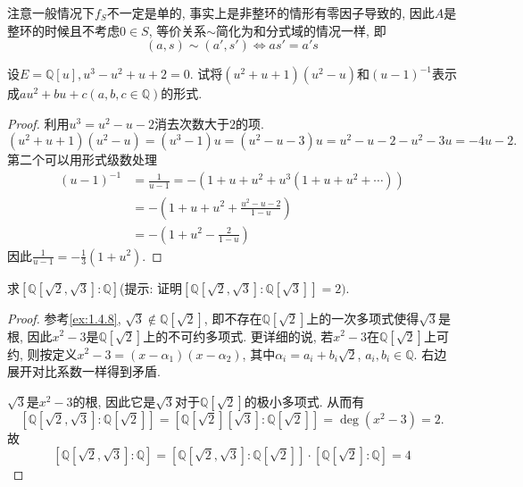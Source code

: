 \begin{remark}
    注意一般情况下$f_S$不一定是单的, 事实上是非整环的情形有零因子导致的, 因此$A$是整环的时候且不考虑$0 \in S$, 等价关系$\sim$简化为和分式域的情况一样, 即
    \[
        (a, s) \sim (a', s') \iff as' = a's
    \]
\end{remark}

\begin{problem}
    设$E = \mathbb{Q}[u], u^3 - u^2 + u + 2 = 0$. 试将$(u^2 + u + 1)(u^2 - u)$和$(u - 1)^{-1}$表示成$au^2 + bu + c (a, b, c \in \mathbb{Q})$的形式.
\end{problem}

\begin{proof}
    利用$u^3 = u^2 - u - 2$消去次数大于$2$的项.     
    \[
        (u^2 + u + 1)(u^2 - u) = (u^3 - 1)u = (u^2 - u - 3)u = u^2 - u - 2 - u^2 - 3u = -4u - 2.
    \]
    第二个可以用形式级数处理
    \[
    \begin{aligned}
        (u - 1)^{-1} &= \frac{1}{u - 1} = -(1 + u + u^2 + u^3(1 + u + u^2 + \cdots))\\
        &= -(1 + u + u^2 + \frac{u^2 - u - 2}{1 - u})\\
        &= -(1 + u^2 - \frac{2}{1 - u})
    \end{aligned}
    \]
    因此$\frac{1}{u - 1} = -\frac{1}{3}(1 + u^2)$.
\end{proof}

\begin{problem}\label{ex:3.1.4}
    求$\left[\mathbb{Q}[\sqrt2, \sqrt3]:\mathbb{Q}\right]$(提示: 证明$\left[\mathbb{Q}[\sqrt2, \sqrt3]:\mathbb{Q}[\sqrt3]\right] = 2)$.
\end{problem}

\begin{proof}
    参考\ref{ex:1.4.8}, $\sqrt{3} \notin \mathbb{Q}[\sqrt{2}]$, 即不存在$\mathbb{Q}[\sqrt{2}]$上的一次多项式使得$\sqrt{3}$是根, 因此$x^2 - 3$是$\mathbb{Q}[\sqrt{2}]$上的不可约多项式. 更详细的说, 若$x^2 - 3$在$\mathbb{Q}[\sqrt{2}]$上可约, 则按定义$x^2 - 3 = (x - \alpha_1)(x - \alpha_2)$, 其中$\alpha_i = a_i + b_i\sqrt{2}$, $a_i, b_i \in \mathbb{Q}$. 右边展开对比系数一样得到矛盾.

    $\sqrt{3}$是$x^2 - 3$的根, 因此它是$\sqrt{3}$对于$\mathbb{Q}[\sqrt{2}]$的极小多项式. 从而有
    \[
        \left[\mathbb{Q}[\sqrt{2}, \sqrt{3}]:\mathbb{Q}[\sqrt{2}]\right] = \left[\mathbb{Q}[\sqrt{2}][\sqrt{3}]:\mathbb{Q}[\sqrt{2}]\right] = \deg(x^2 - 3) = 2.
    \]
    故
    \[
        \left[\mathbb{Q}[\sqrt{2}, \sqrt{3}]:\mathbb{Q}\right] = \left[\mathbb{Q}[\sqrt{2}, \sqrt{3}]:\mathbb{Q}[\sqrt{2}]\right] \cdot \left[\mathbb{Q}[\sqrt{2}]:\mathbb{Q}\right] = 4
    \]
\end{proof}

